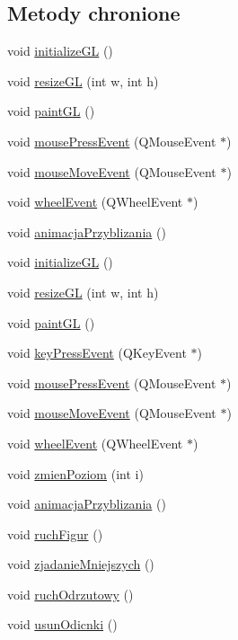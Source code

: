 \subsection*{Metody chronione}
\begin{DoxyCompactItemize}
\item 
void \hyperlink{classMyGLWidget_a5c536c2ebab76533eb16eac0a9830c8e}{initialize\-G\-L} ()
\item 
void \hyperlink{classMyGLWidget_adca50638295dc5d284f4f042331e82a0}{resize\-G\-L} (int w, int h)
\item 
void \hyperlink{classMyGLWidget_ad0e4171fab09ad54d4e2d23e7d6541eb}{paint\-G\-L} ()
\item 
void \hyperlink{classMyGLWidget_a98f0ba932652fe25ae3a469a9b6ee7e5}{mouse\-Press\-Event} (Q\-Mouse\-Event $\ast$)
\item 
void \hyperlink{classMyGLWidget_ac6f3e3d95c1d8b22325437d925812212}{mouse\-Move\-Event} (Q\-Mouse\-Event $\ast$)
\item 
void \hyperlink{classMyGLWidget_a55f9a6c836a9362f59976f86e98a34d8}{wheel\-Event} (Q\-Wheel\-Event $\ast$)
\item 
void \hyperlink{classMyGLWidget_a802184e7a48ae2a79f3daf4519e4fc66}{animacja\-Przyblizania} ()
\item 
void \hyperlink{classMyGLWidget_a5c536c2ebab76533eb16eac0a9830c8e}{initialize\-G\-L} ()
\item 
void \hyperlink{classMyGLWidget_adca50638295dc5d284f4f042331e82a0}{resize\-G\-L} (int w, int h)
\item 
void \hyperlink{classMyGLWidget_ad0e4171fab09ad54d4e2d23e7d6541eb}{paint\-G\-L} ()
\item 
void \hyperlink{classMyGLWidget_abb8eb0ad77ae3e49b96e85dafa1f1f30}{key\-Press\-Event} (Q\-Key\-Event $\ast$)
\item 
void \hyperlink{classMyGLWidget_a98f0ba932652fe25ae3a469a9b6ee7e5}{mouse\-Press\-Event} (Q\-Mouse\-Event $\ast$)
\item 
void \hyperlink{classMyGLWidget_ac6f3e3d95c1d8b22325437d925812212}{mouse\-Move\-Event} (Q\-Mouse\-Event $\ast$)
\item 
void \hyperlink{classMyGLWidget_a55f9a6c836a9362f59976f86e98a34d8}{wheel\-Event} (Q\-Wheel\-Event $\ast$)
\item 
void \hyperlink{classMyGLWidget_a817819b23bc4e0257e155d62f70578e0}{zmien\-Poziom} (int i)
\item 
void \hyperlink{classMyGLWidget_a802184e7a48ae2a79f3daf4519e4fc66}{animacja\-Przyblizania} ()
\item 
void \hyperlink{classMyGLWidget_ac089e8e36a522cc539d044d385ce83b3}{ruch\-Figur} ()
\item 
void \hyperlink{classMyGLWidget_ac4a465bd83a525cb73de97d29d30fe31}{zjadanie\-Mniejszych} ()
\item 
void \hyperlink{classMyGLWidget_a70e0c377b20ec2b13ea55071a1d7e7af}{ruch\-Odrzutowy} ()
\item 
void \hyperlink{classMyGLWidget_ae7df9920940250cc1f25dead0808b0a9}{usun\-Odicnki} ()
\end{DoxyCompactItemize}
